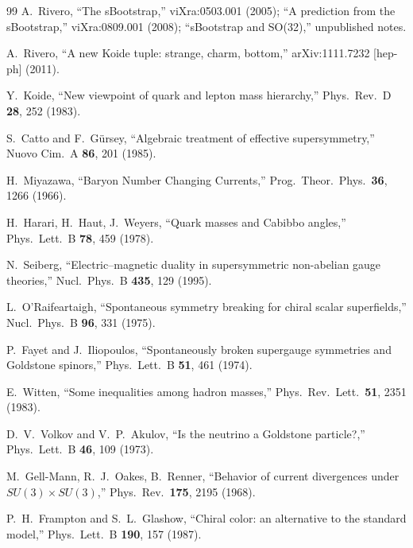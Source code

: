 \documentclass[12pt,a4paper]{article}
\begin{document}
\begin{thebibliography}{99}
A.~Rivero, ``The sBootstrap,'' viXra:0503.001 (2005);
``A prediction from the sBootstrap,'' viXra:0809.001 (2008);
``sBootstrap and SO(32),'' unpublished notes.

A.~Rivero, ``A new Koide tuple: strange, charm, bottom,'' 
arXiv:1111.7232 [hep-ph] (2011).

Y.~Koide, ``New viewpoint of quark and lepton mass hierarchy,'' 
Phys.\ Rev.\ D \textbf{28}, 252 (1983).

S.~Catto and F.~G\"ursey, ``Algebraic treatment of effective 
supersymmetry,'' Nuovo Cim.\ A \textbf{86}, 201 (1985).

H.~Miyazawa, ``Baryon Number Changing Currents,'' 
Prog.\ Theor.\ Phys.\ \textbf{36}, 1266 (1966).

H.~Harari, H.~Haut, J.~Weyers, ``Quark masses and Cabibbo 
angles,'' Phys.\ Lett.\ B \textbf{78}, 459 (1978).

N.~Seiberg, ``Electric--magnetic duality in supersymmetric 
non-abelian gauge theories,'' Nucl.\ Phys.\ B \textbf{435}, 129 
(1995).

L.~O'Raifeartaigh, ``Spontaneous symmetry breaking for chiral 
scalar superfields,'' Nucl.\ Phys.\ B \textbf{96}, 331 (1975).

P.~Fayet and J.~Iliopoulos, ``Spontaneously broken supergauge 
symmetries and Goldstone spinors,'' Phys.\ Lett.\ B \textbf{51}, 
461 (1974).

E.~Witten, ``Some inequalities among hadron masses,'' 
Phys.\ Rev.\ Lett.\ \textbf{51}, 2351 (1983).

D.~V.~Volkov and V.~P.~Akulov, ``Is the neutrino a Goldstone 
particle?,'' Phys.\ Lett.\ B \textbf{46}, 109 (1973).

M.~Gell-Mann, R.~J.~Oakes, B.~Renner, ``Behavior of current 
divergences under $SU(3) \times SU(3)$,'' 
Phys.\ Rev.\ \textbf{175}, 2195 (1968).

P.~H.~Frampton and S.~L.~Glashow, ``Chiral color: an alternative 
to the standard model,'' Phys.\ Lett.\ B \textbf{190}, 157 (1987).

\end{thebibliography}
\end{document}
